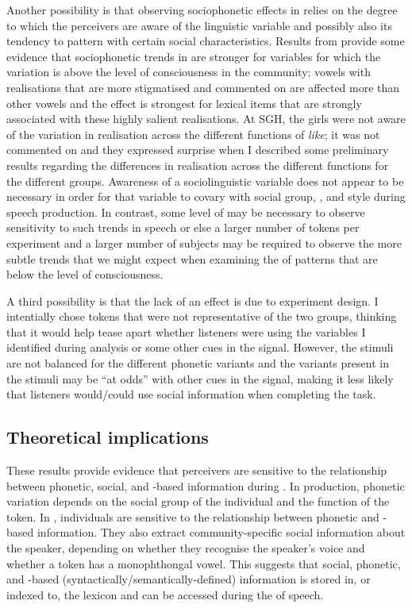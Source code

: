 Another possibility is that observing sociophonetic effects in  relies on the degree to which the perceivers are aware of the linguistic variable and possibly also its tendency to pattern with certain social characteristics. Results from \citet{haynolandrager2006} provide some evidence that sociophonetic trends in  are stronger for variables for which the variation is above the level of consciousness in the community; vowels with realisations that are more stigmatised and commented on are affected more than other vowels and the effect is strongest for lexical items that are strongly associated with these highly salient realisations. At SGH, the girls were not aware of the variation in  realisation across the different functions of \textit{like}; it was not commented on and they expressed surprise when I described some preliminary results regarding the differences in  realisation across the different functions for the different groups. Awareness of a sociolinguistic variable does not appear to be necessary in order for that variable to covary with social group, , and style during speech production. In contrast, some level of  may be necessary to observe sensitivity to such trends in speech  or else a larger number of tokens per experiment and a larger number of subjects may be required to observe the more subtle trends that we might expect when examining the  of patterns that are below the level of consciousness.

A third possibility is that the lack of an effect is due to experiment design. I intentially chose tokens that were not representative of the two groups, thinking that it would help tease apart whether listeners were using the variables I identified during analysis or some other cues in the signal. However, the stimuli are not balanced for the different phonetic variants and the variants present in the stimuli may be ``at odds'' with other cues in the signal, making it less likely that listeners would/could use social information when completing the task.


\subsection{Theoretical implications}

These results provide evidence that perceivers are sensitive to the relationship between phonetic, social, and -based information during . In production, phonetic variation depends on the social group of the individual and the function of the token. In , individuals are sensitive to the relationship between phonetic and -based information. They also extract community-specific social information about the speaker, depending on whether they recognise the speaker's voice and whether a token has a monophthongal vowel. This suggests that social, phonetic, and -based (syntactically/semantically-de\-fined) information is stored in, or indexed to, the lexicon and can be accessed during the  of speech.

